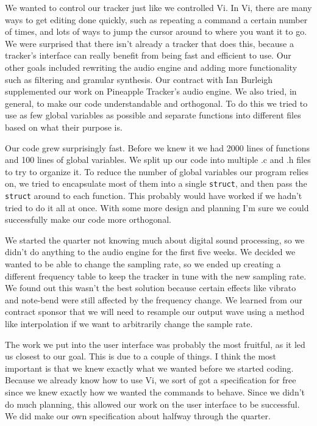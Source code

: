\documentclass[12pt,letterpaper]{article}
\begin{document}
\par
We wanted to control our tracker just like we controlled Vi.
In Vi, there are many ways to get editing done quickly, such as repeating a command a certain number of times, and lots of ways to jump the cursor around to where you want it to go.
We were surprised that there isn't already a tracker that does this, because a tracker's interface can really benefit from being fast and efficient to use.
Our other goals included rewriting the audio engine and adding more functionality such as filtering and granular synthesis.
Our contract with Ian Burleigh supplemented our work on Pineapple Tracker's audio engine.
We also tried, in general, to make our code understandable and orthogonal.
To do this we tried to use as few global variables as possible and separate functions into different files based on what their purpose is.

\par
Our code grew surprisingly fast.
Before we knew it we had 2000 lines of functions and 100 lines of global variables.
We split up our code into multiple .c and .h files to try to organize it.
To reduce the number of global variables our program relies on, we tried to encapsulate most of them into a single {\tt struct}, and then pass the {\tt struct} around to each function.
This probably would have worked if we hadn't tried to do it all at once.
With some more design and planning I'm sure we could successfully make our code more orthogonal.

\par
We started the quarter not knowing much about digital sound processing, so we didn't do anything to the audio engine for the first five weeks.
We decided we wanted to be able to change the sampling rate, so we ended up creating a different frequency table to keep the tracker in tune with the new sampling rate.
We found out this wasn't the best solution because certain effects like vibrato and note-bend were still affected by the frequency change.
We learned from our contract sponsor that we will need to resample our output wave using a method like interpolation if we want to arbitrarily change the sample rate.


\par
The work we put into the user interface was probably the most fruitful, as it led us closest to our goal.
This is due to a couple of things.
I think the most important is that we knew exactly what we wanted before we started coding.
Because we already know how to use Vi, we sort of got a specification for free since we knew exactly how we wanted the commands to behave.
Since we didn't do much planning, this allowed our work on the user interface to be successful.
We did make our own specification about halfway through the quarter.
\end{document}

